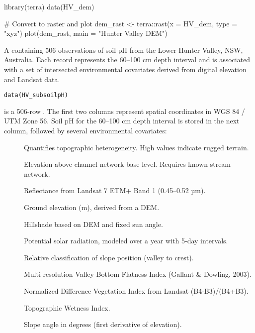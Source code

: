 \documentclass[a4paper]{book}
\begin{document}
%
\begin{Examples}
\begin{ExampleCode}
library(terra)
data(HV_dem)

# Convert to raster and plot
dem_rast <- terra::rast(x = HV_dem, type = "xyz")
plot(dem_rast, main = "Hunter Valley DEM")
\end{ExampleCode}
\end{Examples}
%
\begin{Description}
A  containing 506 observations of soil pH from the Lower Hunter Valley, NSW, Australia. Each record represents the 60–100 cm depth interval and is associated with a set of intersected environmental covariates derived from digital elevation and Landsat data.
\end{Description}
%
\begin{Usage}
\begin{verbatim}
data(HV_subsoilpH)
\end{verbatim}
\end{Usage}
%
\begin{Format}
 is a 506-row . The first two columns represent spatial coordinates in WGS 84 / UTM Zone 56. Soil pH for the 60–100 cm depth interval is stored in the next column, followed by several environmental covariates:

\begin{description}

\item[] Quantifies topographic heterogeneity. High values indicate rugged terrain.
\item[] Elevation above channel network base level. Requires known stream network.
\item[] Reflectance from Landsat 7 ETM+ Band 1 (0.45–0.52 µm).
\item[] Ground elevation (m), derived from a DEM.
\item[] Hillshade based on DEM and fixed sun angle.
\item[] Potential solar radiation, modeled over a year with 5-day intervals.
\item[] Relative classification of slope position (valley to crest).
\item[] Multi-resolution Valley Bottom Flatness Index (Gallant \& Dowling, 2003).
\item[] Normalized Difference Vegetation Index from Landsat (B4-B3)/(B4+B3).
\item[] Topographic Wetness Index.
\item[] Slope angle in degrees (first derivative of elevation).

\end{description}

\end{Format}
\end{document}
